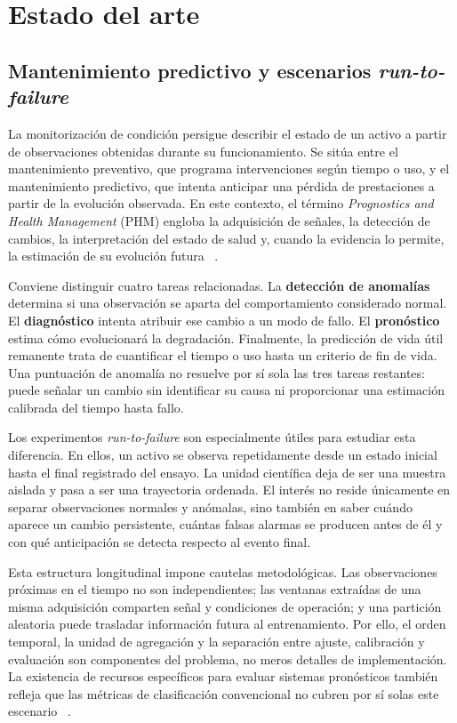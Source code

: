 \chapter{Estado del arte}

\section{Mantenimiento predictivo y escenarios \textit{run-to-failure}}

La monitorización de condición persigue describir el estado de un activo a
partir de observaciones obtenidas durante su funcionamiento. Se sitúa entre el
mantenimiento preventivo, que programa intervenciones según tiempo o uso, y el
mantenimiento predictivo, que intenta anticipar una pérdida de prestaciones a
partir de la evolución observada. En este contexto, el término
\textit{Prognostics and Health Management} (PHM) engloba la adquisición de
señales, la detección de cambios, la interpretación del estado de salud y, cuando
la evidencia lo permite, la estimación de su evolución futura
~\cite{jardine2006_condition_based,lei2018_machinery_prognostics}.

Conviene distinguir cuatro tareas relacionadas. La \textbf{detección de
anomalías} determina si una observación se aparta del comportamiento considerado
normal. El \textbf{diagnóstico} intenta atribuir ese cambio a un modo de fallo.
El \textbf{pronóstico} estima cómo evolucionará la degradación. Finalmente, la
predicción de vida útil remanente trata de cuantificar el tiempo o uso hasta un
criterio de fin de vida. Una puntuación de anomalía no resuelve por sí sola las
tres tareas restantes: puede señalar un cambio sin identificar su causa ni
proporcionar una estimación calibrada del tiempo hasta fallo.

Los experimentos \textit{run-to-failure} son especialmente útiles para estudiar
esta diferencia. En ellos, un activo se observa repetidamente desde un estado
inicial hasta el final registrado del ensayo. La unidad científica deja de ser
una muestra aislada y pasa a ser una trayectoria ordenada. El interés no reside
únicamente en separar observaciones normales y anómalas, sino también en saber
cuándo aparece un cambio persistente, cuántas falsas alarmas se producen antes
de él y con qué anticipación se detecta respecto al evento final.

Esta estructura longitudinal impone cautelas metodológicas. Las observaciones
próximas en el tiempo no son independientes; las ventanas extraídas de una misma
adquisición comparten señal y condiciones de operación; y una partición aleatoria
puede trasladar información futura al entrenamiento. Por ello, el orden temporal,
la unidad de agregación y la separación entre ajuste, calibración y evaluación
son componentes del problema, no meros detalles de implementación. La existencia
de recursos específicos para evaluar sistemas pronósticos también refleja que
las métricas de clasificación convencional no cubren por sí solas este escenario
~\cite{saxena2008_prognostic_metrics,nasa_prognostics_metrics_library}.

